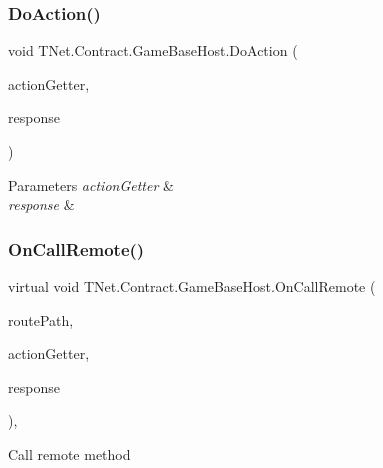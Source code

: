 \subsubsection{\texorpdfstring{Do\+Action()}{DoAction()}}
{\footnotesize\ttfamily void T\+Net.\+Contract.\+Game\+Base\+Host.\+Do\+Action (\begin{DoxyParamCaption}\item[{\mbox{\hyperlink{class_t_net_1_1_service_1_1_action_getter}{Action\+Getter}}}]{action\+Getter,  }\item[{\mbox{\hyperlink{class_t_net_1_1_service_1_1_base_game_response}{Base\+Game\+Response}}}]{response }\end{DoxyParamCaption})\hspace{0.3cm}{\ttfamily [protected]}}






\begin{DoxyParams}{Parameters}
{\em action\+Getter} & \\
\hline
{\em response} & \\
\hline
\end{DoxyParams}
\mbox{\label{class_t_net_1_1_contract_1_1_game_base_host_a04444ec9b97c907dc7bc49dbdfcc6ee1}} 
\subsubsection{\texorpdfstring{On\+Call\+Remote()}{OnCallRemote()}}
{\footnotesize\ttfamily virtual void T\+Net.\+Contract.\+Game\+Base\+Host.\+On\+Call\+Remote (\begin{DoxyParamCaption}\item[{string}]{route\+Path,  }\item[{\mbox{\hyperlink{class_t_net_1_1_service_1_1_action_getter}{Action\+Getter}}}]{action\+Getter,  }\item[{Message\+Structure}]{response }\end{DoxyParamCaption})\hspace{0.3cm}{\ttfamily [protected]}, {\ttfamily [virtual]}}



Call remote method 


